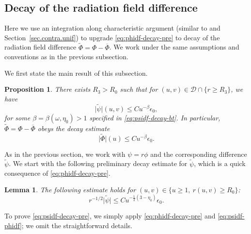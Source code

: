 \documentclass[10pt, reqno]{amsart}
\newtheorem{lemma}[theorem]{Lemma}
\newtheorem{proposition}[theorem]{Proposition}
\theoremstyle{definition}
\theoremstyle{remark}
\theoremstyle{conjecture}
\numberwithin{equation}{section}
\newcommand{\abs}[1]{\vert#1\vert}
\newcommand{\set}[1]{\{#1\}}
\newcommand{\0}{\emptyset}
\newcommand{\bt}{\beta}
\newcommand{\eps}{\epsilon}
\newcommand{\omg}{\omega}
\newcommand{\calD}{\mathcal D}
\newcommand{\psibg}{\overline{\psi}}				%
\newcommand{\Phibg}{\overline{\Phi}}				%
\newcommand{\psidf}{\widetilde{\psi}}				%
\newcommand{\Phidf}{\widetilde{\Phi}}				%
\begin{document}
\subsection{Decay of the radiation field difference} \label{subsec:int-char}
Here we use an integration along characteristic argument (similar to \cite{LO1} and Section~\ref{sec.contra.unif}) to upgrade \eqref{eq:phidf-decay-pre} to decay of the radiation field difference $\Phidf = \Phi - \Phibg$. We work under the same assumptions and conventions as in the previous subsection.

We first state the main result of this subsection.
\begin{proposition} \label{prop:psidf-decay}
There exists $R_{3} > R_{0}$ such that for $(u, v) \in \calD \cap \set{r \geq R_{3}}$, we have
\begin{equation} \label{eq:psidf-decay}
	\abs{\psidf}(u, v) \leq C u^{-\bt} \eps_{0},
\end{equation}
for some $\bt = \bt(\omg, \eta_{0}) > 1$ specified in \eqref{eq:psidf-decay-bt}.
In particular, $\Phidf = \Phi - \Phibg$ obeys the decay estimate
\begin{equation} \label{eq:Phidf-decay}
	\abs{\Phidf}(u) \leq C u^{-\bt} \eps_{0}.
\end{equation}
\end{proposition}

As in the previous section, we work with $\psi = r \phi$ and the corresponding difference $\psidf$. We start with the following preliminary decay estimate for $\psidf$, which is a quick consequence of \eqref{eq:phidf-decay-pre}.
\begin{lemma} \label{lem:psidf-decay-pre}
The following estimate holds for $(u, v) \in \set{u \geq 1, \ r(u, v) \geq R_{0}}$:
\begin{equation} \label{eq:psidf-decay-pre}
	r^{-1/2} \abs{\psidf} \leq C u^{-\frac{1}{2}(3-\eta_{0})}  \eps_{0}.
\end{equation}
\end{lemma}
To prove \eqref{eq:psidf-decay-pre}, we simply apply \eqref{eq:phidf-decay-pre} and \eqref{eq:psidf-phidf}; we omit the straightforward details.
\end{document}
